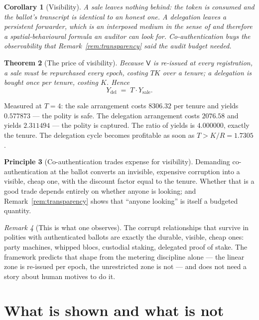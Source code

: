 \documentclass[11pt]{article}
\theoremstyle{plain}
\newtheorem{theorem}{Theorem}[section]
\newtheorem{corollary}[theorem]{Corollary}
\theoremstyle{definition}
\newtheorem{principle}[theorem]{Principle}
\theoremstyle{remark}
\newtheorem{remark}[theorem]{Remark}
\newcommand{\Vt}{\mathsf{V}}
\begin{document}
\begin{corollary}[Visibility]
A sale leaves nothing behind: the token is consumed and the ballot's transcript
is identical to an honest one. A delegation leaves a persistent forwarder, which
is an interposed medium in the sense of \cite[\S5]{engine} and therefore a
spatial-behavioural formula an auditor can look for. Co-authentication buys the
observability that Remark~\ref{rem:transparency} said the audit budget needed.
\end{corollary}

\begin{theorem}[The price of visibility]
\label{thm:price-vis}
Because $\Vt$ is re-issued at every registration, a sale must be repurchased
every epoch, costing $TK$ over a tenure; a delegation is bought once per tenure,
costing $K$. Hence
\[
  Y_{\mathrm{del}} \;=\; T\cdot Y_{\mathrm{sale}} .
\]
\end{theorem}

Measured at $T = 4$: the sale arrangement costs $8306.32$ per tenure and yields
$0.577873$ --- the polity is safe. The delegation arrangement costs $2076.58$
and yields $2.311494$ --- the polity is captured. The ratio of yields is
$4.000000$, exactly the tenure. The delegation cycle becomes profitable as soon
as $T > K/R = 1.7305$.

\begin{principle}[Co-authentication trades expense for visibility]
\label{prin:trade}
Demanding co-authentication at the ballot converts an invisible, expensive
corruption into a visible, cheap one, with the discount factor equal to the
tenure. Whether that is a good trade depends entirely on whether anyone is
looking; and Remark~\ref{rem:transparency} shows that ``anyone looking'' is
itself a budgeted quantity.
\end{principle}

\begin{remark}[This is what one observes]
The corrupt relationships that survive in polities with authenticated ballots
are exactly the durable, visible, cheap ones: party machines, whipped blocs,
custodial staking, delegated proof of stake. The framework predicts that shape
from the metering discipline alone --- the linear zone is re-issued per epoch,
the unrestricted zone is not --- and does not need a story about human motives
to do it.
\end{remark}

\section{What is shown and what is not}
\label{sec:shown}
\end{document}
